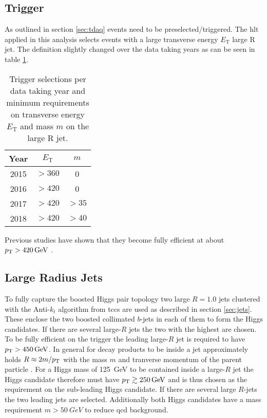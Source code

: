 \subsection{Trigger}
As outlined in section \ref{sec:tdaq} events need to be preselected/triggered. The \ac{hlt} applied in this analysis selects events with a large transverse energy $E_\text{T}$ large R jet. The definition slightly changed over the data taking years as can be seen in table \ref{tab:trigger}.
\begin{table}[htbp]
    \centering
    \caption{Trigger selections per data taking year and minimum requirements on transverse energy $E_\text{T}$ and mass $m$ on the large R jet. }
    \begin{tabular}{ccc}
        \hline
        Year & $E_\text{T}$ & $m$   \\ \hline
        2015 & $>360$       & 0     \\
        2016 & $>420$       & 0     \\
        2017 & $>420$       & $>35$ \\
        2018 & $>420$       & $>40$ \\ \hline
    \end{tabular}
    \label{tab:trigger}
\end{table}
Previous studies have shown that they become fully efficient at about $p_{\text{T}}>\qty[]{420}{GeV}$ \citep{ATL-COM-PHYS-2020-083,ATL-COM-PHYS-2023-033}.

\subsection{Large Radius Jets}
To fully capture the boosted Higgs pair topology two large $R=1.0$ jets clustered with the Anti-$k_t$ algorithm from \acp{tcc} are used as described in section \ref{sec:jets}. These enclose the two boosted collimated $b$-jets in each of them to form the Higgs candidates. If there are several large-$R$ jets the two with the highest \pt are chosen. To be fully efficient on the trigger the leading large-$R$ jet is required to have $p_{\text{T}}>\qty[]{450}{GeV}$. In general for decay products to be inside a jet approximately holds $R\approx 2m/p_{\text{T}}$ with the mass $m$ and tranverse momentum of the parent particle \citep{ATL-COM-PHYS-2020-083}. For a Higgs mass of \qty[]{125}{GeV} to be contained inside a large-$R$ jet the Higgs candidate therefore must have $p_{\text{T}}\gtrsim \qty[]{250}{GeV}$ and is thus chosen as the \pt requirement on the sub-leading Higgs candidate. If there are several large $R$-jets the two leading \pt jets are selected. Additionally both Higgs candidates have a mass requirement $m>\qty[]{50}{GeV}$ to reduce \ac{qcd} background.

